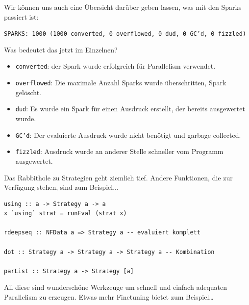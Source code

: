 \documentclass{beamer}
\begin{document}
\begin{frame}
Wir können uns auch eine Übersicht darüber geben lassen, was mit den Sparks passiert ist:

\scriptsize
\texttt{SPARKS: 1000 (1000 converted, 0 overflowed, 0 dud, 0 GC'd, 0 fizzled)}
\normalsize\bigskip
\pause

Was bedeutet das jetzt im Einzelnen?\pause
\begin{itemize}
\item \texttt{converted}: der Spark wurde erfolgreich für Parallelism verwendet.\pause
\item \texttt{overflowed}: Die maximale Anzahl Sparks wurde überschritten, Spark gelöscht.\pause
\item \texttt{dud}: Es wurde ein Spark für einen Ausdruck erstellt, der bereits ausgewertet wurde.\pause
\item \texttt{GC'd}: Der evaluierte Ausdruck wurde nicht benötigt und garbage collected.\pause
\item \texttt{fizzled}: Ausdruck wurde an anderer Stelle schneller vom Programm ausgewertet.
\end{itemize}

\end{frame}


\begin{frame}[fragile]

Das Rabbithole zu Strategien geht ziemlich tief. Andere Funktionen, die zur Verfügung stehen, sind zum Beispiel... \bigskip

\begin{verbatim}
using :: a -> Strategy a -> a
x `using` strat = runEval (strat x)

rdeepseq :: NFData a => Strategy a -- evaluiert komplett

dot :: Strategy a -> Strategy a -> Strategy a -- Kombination

parList :: Strategy a -> Strategy [a]
\end{verbatim}
\pause

All diese sind wunderschöne Werkzeuge um schnell und einfach adequaten Parallelism zu erzeugen. Etwas mehr Finetuning bietet zum Beispiel\dots

\end{frame}

\end{document}
